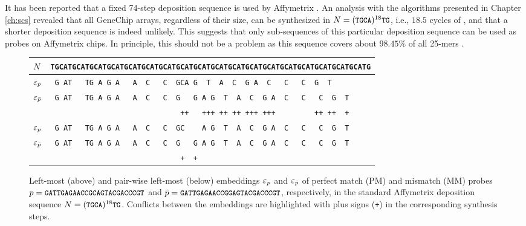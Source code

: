 It has been reported that a fixed 74-step deposition sequence is used by
Affymetrix \citep{Kahng2004}. An analysis with the algorithms presented in
Chapter \ref{ch:scs} revealed that all GeneChip arrays, regardless of their
size, can be synthesized in $N=({\text{\small{\tt{TGCA}}}})^{18}{\text{\small{\tt{TG}}}}$, i.e., $18.5$ cycles
of , and that a shorter deposition sequence is indeed unlikely. This
suggests that only sub-sequences of this particular deposition sequence can be
used as probes on Affymetrix chips. In principle, this should not be a problem
as this sequence covers about $98.45\%$ of all 25-mers \citep{Rahmann2006}.

\begin{figure}[t]\centering
\begin{tabular}{lc}
$N$              & \footnotesize{\tt{\verb|TGCATGCATGCATGCATGCATGCATGCATGCATGCATGCATGCATGCATGCATGCATGCATGCATGCATGCATG|}} \\
\hline
$\varepsilon_p$         & \footnotesize{\tt{\verb| G AT   TG A G A   A  C   C  GCA G  T  A  C  G A  C   C   C  G  T         |}} \\
$\varepsilon_{\bar{p}}$ & \footnotesize{\tt{\verb| G AT   TG A G A   A  C   C  G   G A G  T  A  C  G A  C   C   C  G  T     |}} \\
                 & \footnotesize{\tt{\verb|                              ++   +++ ++ ++ +++ +++         ++ ++  +     |}} \\
\hline
$\varepsilon_p$         & \footnotesize{\tt{\verb| G AT   TG A G A   A  C   C  GC    A G  T  A  C  G A  C   C   C  G  T     |}} \\
$\varepsilon_{\bar{p}}$ & \footnotesize{\tt{\verb| G AT   TG A G A   A  C   C  G   G A G  T  A  C  G A  C   C   C  G  T     |}} \\
                 & \footnotesize{\tt{\verb|                              +  +                                        |}} \\
\hline
\end{tabular}
\caption{\label{fig:pairwise_leftmost}%
  Left-most (above) and pair-wise left-most (below) embeddings $\varepsilon_p$ and
  $\varepsilon_{\bar{p}}$ of perfect match (PM) and mismatch (MM) probes
  $p={\text{\small{\tt{GATTGAGAACCGCAGTACGACCCGT}}}}$ and
  $\bar{p}={\text{\small{\tt{GATTGAGAACCGGAGTACGACCCGT}}}}$, respectively, in the standard
  Affymetrix deposition sequence $N=({\text{\small{\tt{TGCA}}}})^{18}{\text{\small{\tt{TG}}}}$. Conflicts
  between the embeddings are highlighted with plus signs (\small{\tt{+}})
  in the corresponding synthesis steps.}
\end{figure}

